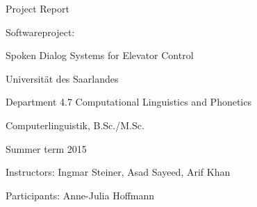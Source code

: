 
\begin{center} Project Report \end{center}
\hspace{1cm}
\begin{center} Softwareproject: \end{center}
\begin{center}Spoken Dialog Systems for Elevator Control \end{center}
\begin{center} Universität des Saarlandes \end{center}
\begin{center} Department 4.7 Computational Linguistics and Phonetics \end{center}
\begin{center} Computerlinguistik, B.Sc./M.Sc. \end{center}
\begin{center} Summer term 2015 \end{center} 

\hspace{1cm}
\begin{center}Instructors: Ingmar Steiner, Asad Sayeed, Arif Khan \end{center}

\begin{center} Participants: Anne-Julia Hoffmann \end{center} 

